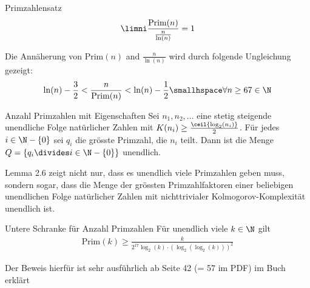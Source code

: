 \begin{theorem}[]{Primzahlensatz}
    \vspace{-0.3cm}
    \begin{align*}
        \limni \frac{\text{Prim}(n)}{\frac{n}{\ln(n)}} = 1
    \end{align*}
\end{theorem}
Die Annäherung von $\text{Prim}(n)$ and $\frac{n}{\ln(n)}$ wird durch folgende Ungleichung gezeigt:
\begin{align*}
    \ln(n) - \frac{3}{2} < \frac{n}{\text{Prim}(n)} < \ln(n) - \frac{1}{2} \smallhspace \forall n \geq 67 \in \N
\end{align*}

\begin{lemma}[]{Anzahl Primzahlen mit Eigenschaften}
    Sei $n_1, n_2, \ldots$ eine stetig steigende unendliche Folge natürlicher Zahlen mit $K(n_i) \geq \frac{\ceil{\log_2(n_i)}}{2}$.
    Für jedes $i \in \N - \{ 0 \}$ sei $q_i$ die grösste Primzahl, die $n_i$ teilt.
    Dann ist die Menge $Q = \{ q_i \divides i \in \N - \{ 0 \} \}$ unendlich.
\end{lemma}

Lemma 2.6 zeigt nicht nur, dass es unendlich viele Primzahlen geben muss, sondern sogar, dass die Menge der grössten Primzahlfaktoren einer beliebigen unendlichen Folge natürlicher Zahlen mit nichttrivialer Kolmogorov-Komplexität unendlich ist.

\begin{theorem}[]{Untere Schranke für Anzahl Primzahlen}
    Für unendlich viele $k \in \N$ gilt
    \begin{align*}
        \text{Prim}(k) \geq \frac{k}{2^{17} \log_2(k) \cdot (\log_2(\log_2(k)))^2}
    \end{align*}
\end{theorem}

Der Beweis hierfür ist sehr ausführlich ab Seite 42 (= 57 im PDF) im Buch erklärt
